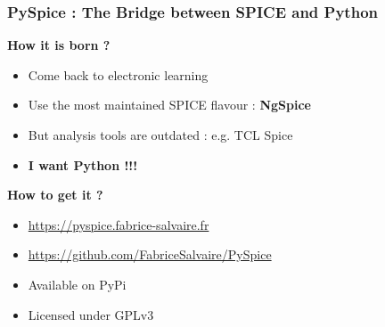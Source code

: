 
\begin{frame}
  \frametitle{PySpice :  The Bridge between SPICE and Python}
  \textbf{How it is born ?}
  \begin{itemize}
  \item Come back to electronic learning
  \item Use the most maintained SPICE flavour : \textbf{NgSpice}
  \item But analysis tools are outdated : e.g. TCL Spice
  \item \textbf{I want Python !!!}
  \end{itemize}
  \begin{center}
  \end{center}
  \textbf{How to get it ?}
  \begin{itemize}
  \item \url{https://pyspice.fabrice-salvaire.fr}
  \item \url{https://github.com/FabriceSalvaire/PySpice}
  \item Available on PyPi
  \item Licensed under GPLv3
  \end{itemize}
\end{frame}

